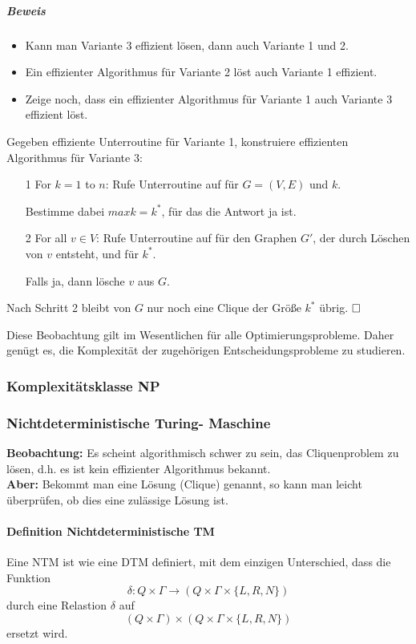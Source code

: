 \documentclass[fleqn]{scrartcl}
\begin{document}
\subparagraph{Beweis}
\begin{itemize}
\item Kann man Variante 3 effizient lösen, dann auch Variante 1 und 2.
\item Ein effizienter Algorithmus für Variante 2 löst auch Variante 1 effizient.
\item Zeige noch, dass ein effizienter Algorithmus für Variante 1 auch Variante 3 effizient löst.
\end{itemize}

Gegeben effiziente Unterroutine für Variante 1, konstruiere effizienten Algorithmus für Variante 3:
\begin{itemize}
\item[1] For $k = 1$ to $n$: Rufe Unterroutine auf für $G=(V, E)$ und $k$.

Bestimme dabei $max k = k^*$, für das die Antwort ja ist.
\item[2] For all $v \in V$: Rufe Unterroutine auf für den Graphen $G'$, der durch Löschen von $v$ entsteht, und für $k^*$.

Falls \glqq ja\grqq, dann lösche $v$ aus $G$.
\end{itemize}

Nach Schritt 2 bleibt von $G$ nur noch eine Clique der Größe $k^*$ übrig. $\hfill \square$

Diese Beobachtung gilt im Wesentlichen für alle Optimierungsprobleme. Daher genügt es, die Komplexität der zugehörigen Entscheidungsprobleme zu studieren.

\subsubsection{Komplexitätsklasse NP}
\subsubsection{Nichtdeterministische Turing- Maschine}
\textbf{Beobachtung:} Es scheint algorithmisch schwer zu sein, das Cliquenproblem zu lösen, d.h. es ist kein effizienter Algorithmus bekannt.\\
\textbf{Aber:} Bekommt man eine Lösung (Clique) genannt, so kann man leicht überprüfen, ob dies eine zulässige Lösung ist.
\paragraph{Definition Nichtdeterministische TM} Eine NTM ist wie eine DTM definiert, mit dem einzigen Unterschied, dass die Funktion 
\[\delta : Q \times \Gamma \rightarrow (Q \times \Gamma \times \{L, R, N\})\]
durch eine Relastion $\delta$ auf \[(Q \times \Gamma) \times (Q \times \Gamma \times \{L, R, N\})\] ersetzt wird.
\end{document}
